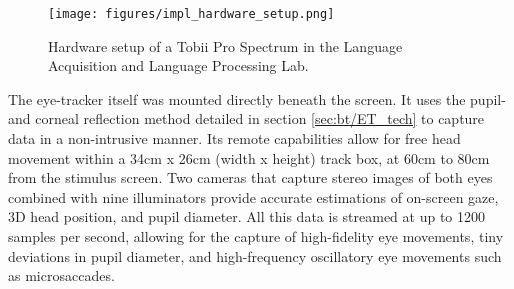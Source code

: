 \begin{figure}[h]
    \centering
    \texttt{[image: figures/impl\_hardware\_setup.png]}
    \caption{Hardware setup of a Tobii Pro Spectrum in the Language Acquisition and Language Processing Lab.}
    \label{fig:impl_hardware_setup}
\end{figure}

The eye-tracker itself was mounted directly beneath the screen. It uses the pupil- and corneal reflection method detailed in section \ref{sec:bt/ET_tech} to capture data in a non-intrusive manner. Its remote capabilities allow for free head movement within a 34cm x 26cm (width x height) track box, at 60cm to 80cm from the stimulus screen. Two cameras that capture stereo images of both eyes combined with nine illuminators provide accurate estimations of on-screen gaze, 3D head position, and pupil diameter. All this data is streamed at up to 1200 samples per second, allowing for the capture of high-fidelity eye movements, tiny deviations in pupil diameter, and high-frequency oscillatory eye movements such as microsaccades. 